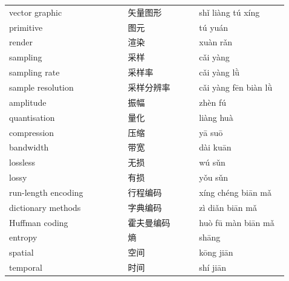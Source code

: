 \documentclass[11pt]{article}
\begin{document}
\begin{longtable}{@{}p{0.40\linewidth}p{0.24\linewidth}p{0.30\linewidth}@{}}
vector graphic & 矢量图形 & shǐ liàng tú xíng \\
primitive & 图元 & tú yuán \\
render & 渲染 & xuàn rǎn \\
sampling & 采样 & cǎi yàng \\
sampling rate & 采样率 & cǎi yàng lǜ \\
sample resolution & 采样分辨率 & cǎi yàng fēn biàn lǜ \\
amplitude & 振幅 & zhèn fú \\
quantisation & 量化 & liàng huà \\
compression & 压缩 & yā suō \\
bandwidth & 带宽 & dài kuān \\
lossless & 无损 & wú sǔn \\
lossy & 有损 & yǒu sǔn \\
run-length encoding & 行程编码 & xíng chéng biān mǎ \\
dictionary methods & 字典编码 & zì diǎn biān mǎ \\
Huffman coding & 霍夫曼编码 & huò fū màn biān mǎ \\
entropy & 熵 & shāng \\
spatial & 空间 & kōng jiān \\
temporal & 时间 & shí jiān \\
\end{longtable}
\end{document}
